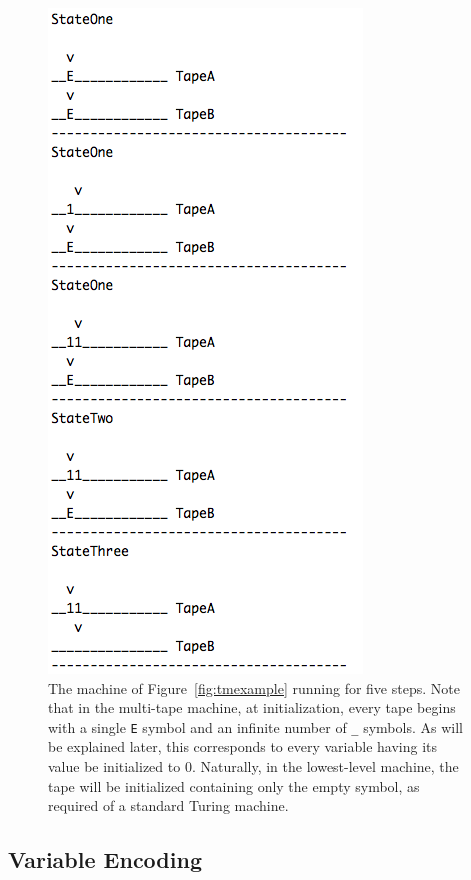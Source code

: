 \begin{figure} 
\begin{center} 
\includegraphics[scale=0.4]{figs/behavior.png} 
\caption{The machine of Figure~\ref{fig:tmexample} running for five steps. Note that in the multi-tape machine, at initialization, every tape begins with a single \texttt{E} symbol and an infinite number of \texttt{\_} symbols. As will be explained later, this corresponds to every variable having its value be initialized to 0. Naturally, in the lowest-level machine, the tape will be initialized containing only the empty symbol, as required of a standard Turing machine. \label{fig:behavior}} 
\end{center} 
\end{figure}

\subsection{Variable Encoding}

